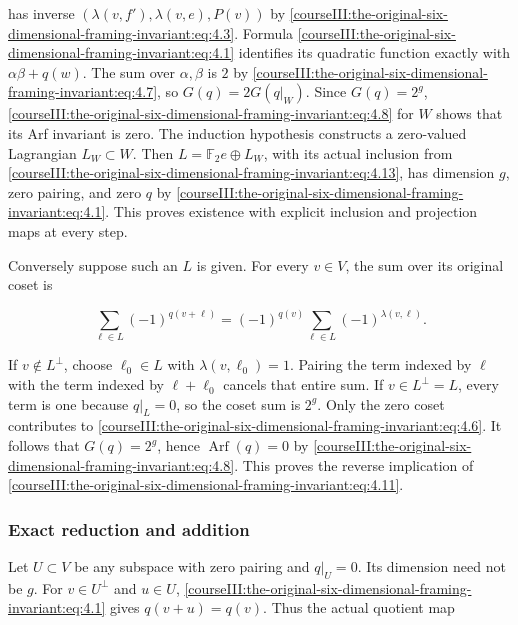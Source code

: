 has inverse \((\lambda(v,f'),\lambda(v,e),P(v))\) by \eqref{courseIII:the-original-six-dimensional-framing-invariant:eq:4.3}. Formula \eqref{courseIII:the-original-six-dimensional-framing-invariant:eq:4.1} identifies its quadratic function exactly with
\(\alpha\beta+q(w)\).
The sum over \(\alpha,\beta\) is \(2\) by \eqref{courseIII:the-original-six-dimensional-framing-invariant:eq:4.7}, so \(G(q)=2G(q|_W)\). Since \(G(q)=2^g\), \eqref{courseIII:the-original-six-dimensional-framing-invariant:eq:4.8} for \(W\) shows that its Arf invariant is zero. The induction hypothesis constructs a zero-valued Lagrangian \(L_W\subset W\). Then \(L=\mathbb F_2e\oplus L_W\), with its actual inclusion from \eqref{courseIII:the-original-six-dimensional-framing-invariant:eq:4.13}, has dimension \(g\), zero pairing, and zero \(q\) by \eqref{courseIII:the-original-six-dimensional-framing-invariant:eq:4.1}. This proves existence with explicit inclusion and projection maps at every step.

Conversely suppose such an \(L\) is given. For every \(v\in V\), the sum over its original coset is

\begin{equation}
\sum_{\ell\in L}(-1)^{q(v+\ell)}
   =(-1)^{q(v)}
       \sum_{\ell\in L}(-1)^{\lambda(v,\ell)}.
 \label{courseIII:the-original-six-dimensional-framing-invariant:eq:4.14}
\end{equation}

If \(v\notin L^\perp\), choose \(\ell_0\in L\) with \(\lambda(v,\ell_0)=1\). Pairing the term indexed by \(\ell\) with the term indexed by \(\ell+\ell_0\) cancels that entire sum. If \(v\in L^\perp=L\), every term is one because \(q|_L=0\), so the coset sum is \(2^g\). Only the zero coset contributes to \eqref{courseIII:the-original-six-dimensional-framing-invariant:eq:4.6}. It follows that \(G(q)=2^g\), hence \(\operatorname{Arf}(q)=0\) by \eqref{courseIII:the-original-six-dimensional-framing-invariant:eq:4.8}. This proves the reverse implication of \eqref{courseIII:the-original-six-dimensional-framing-invariant:eq:4.11}.

\subsubsection{Exact reduction and addition}
\label{courseIII:the-original-six-dimensional-framing-invariant:section-4.2}

Let \(U\subset V\) be any subspace with zero pairing and \(q|_U=0\). Its dimension need not be \(g\). For \(v\in U^\perp\) and \(u\in U\), \eqref{courseIII:the-original-six-dimensional-framing-invariant:eq:4.1} gives \(q(v+u)=q(v)\). Thus the actual quotient map

